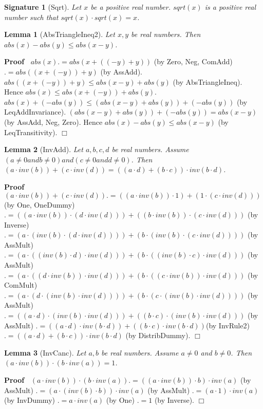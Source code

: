 \documentclass{article}
\newenvironment{forthel}{\begin{leftbar}}{\end{leftbar}}
\newenvironment{proof}{\noindent\textbf{Proof\ }}{\hspace*{\fill}$\Box$\medskip}
\newtheorem{lemma}{Lemma}
\newtheorem{signature}{Signature}
\begin{document}
\begin{forthel}
	
	
	\begin{signature} [Sqrt]
	Let $x$ be a positive real number. $sqrt(x)$ is a positive real number such that $sqrt(x) \cdot sqrt(x) = x$.
	\end{signature}
	
	\begin{lemma} [AbsTriangleIneq2]
	Let $x,y$ be real numbers. Then $abs(x) - abs(y) \leq abs(x - y)$.
	\end{lemma}
	\begin{proof}
	$abs(x) .= abs(x + ((-y) + y))$ (by Zero, Neg, ComAdd)
	$.= abs((x + (-y)) + y)$ (by AssAdd).
	$abs((x + (-y)) + y) \leq abs(x - y) + abs(y)$ (by AbsTriangleIneq).
	Hence $abs(x) \leq abs(x + (-y)) + abs(y)$.
	$abs(x) + (-abs(y)) \leq (abs(x - y) + abs(y)) + (-abs(y))$ (by LeqAddInvariance).
	$(abs(x - y) + abs(y)) + (-abs(y)) = abs(x - y)$ (by AssAdd, Neg, Zero).
	Hence $abs(x) - abs(y) \leq abs(x - y)$ (by LeqTransitivity).
	\end{proof}
	
	
	\begin{lemma} [InvAdd]
	Let $a,b,c,d$ be real numbers. Assume $(a \neq 0 and b \neq 0) and (c \neq 0 and d \neq 0)$. 
	Then $(a \cdot inv(b)) + (c \cdot inv(d)) = ((a \cdot d) + (b \cdot c)) \cdot inv(b \cdot d)$.
	\end{lemma}
	\begin{proof}
	$(a \cdot inv(b)) + (c \cdot inv(d)) .= ((a \cdot inv(b)) \cdot 1) + (1 \cdot (c \cdot inv(d)))$ (by One, OneDummy)
	$.= ((a \cdot inv(b)) \cdot (d \cdot inv(d))) + ((b \cdot inv(b)) \cdot (c \cdot inv(d)))$ (by Inverse)
	$.= (a \cdot (inv(b) \cdot (d \cdot inv(d)))) + (b \cdot (inv(b) \cdot (c \cdot inv(d))))$ (by AssMult)
	$.= (a \cdot ((inv(b) \cdot d) \cdot inv(d))) + (b \cdot ((inv(b) \cdot c) \cdot inv(d)))$ (by AssMult)
	$.= (a \cdot ((d \cdot inv(b)) \cdot inv(d))) + (b \cdot ((c \cdot inv(b)) \cdot inv(d)))$ (by ComMult)
	$.= (a \cdot (d \cdot (inv(b) \cdot inv(d)))) + (b \cdot (c \cdot (inv(b) \cdot inv(d))))$ (by AssMult)
	$.= ((a \cdot d) \cdot (inv(b) \cdot inv(d))) + ((b \cdot c) \cdot (inv(b) \cdot inv(d)))$ (by AssMult)
	$.= ((a \cdot d) \cdot inv(b \cdot d)) + ((b \cdot c) \cdot inv(b \cdot d)) $(by InvRule2)
	$.= ((a \cdot d) + (b \cdot c)) \cdot inv(b \cdot d)$ (by DistribDummy).
	\end{proof}
	
	
	
	\begin{lemma} [InvCanc]
	Let $a, b$ be real numbers. Assume $a \neq 0$ and $b \neq 0$.
	Then $(a \cdot inv(b)) \cdot (b \cdot inv(a)) = 1$.
	\end{lemma}
	\begin{proof}
	$(a \cdot inv(b)) \cdot (b \cdot inv(a)) .= ((a \cdot inv(b)) \cdot b) \cdot inv(a)$ (by AssMult)
	$.= (a \cdot (inv(b) \cdot b)) \cdot inv(a)$ (by AssMult)
	$.= (a \cdot 1) \cdot inv(a)$ (by InvDummy)
	$.= a \cdot inv(a)$ (by One)
	$.= 1$ (by Inverse).
	\end{proof}
	

\end{forthel}
\end{document}

